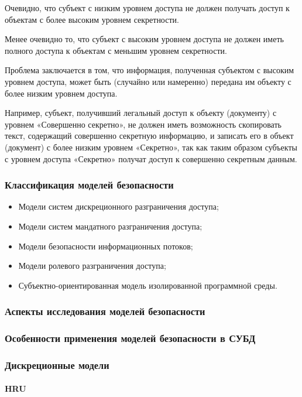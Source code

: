 Очевидно, что субъект с низким уровнем доступа не должен получать
доступ к объектам с более высоким уровнем секретности.

Менее очевидно то, что субъект с высоким уровнем доступа не должен иметь полного доступа к объектам с меньшим уровнем секретности.

Проблема заключается в том, что информация, полученная субъектом с высоким уровнем доступа, может быть (случайно или намеренно) передана им объекту с более низким уровнем доступа.

Например, субъект, получивший легальный доступ к объекту (документу) с уровнем «Совершенно секретно», не должен иметь возможность скопировать текст, содержащий совершенно секретную информацию, и записать его в объект (документ) с более низким уровнем «Секретно», так как таким образом субъекты с уровнем доступа «Секретно» получат доступ к совершенно секретным данным. 

\subsubsection{Классификация моделей безопасности}

\begin{itemize}
    \item Модели систем дискреционного разграничения доступа;
    \item Модели систем мандатного разграничения доступа;
    \item Модели безопасности информационных потоков;
    \item Модели ролевого разграничения доступа;
    \item Субъектно-ориентированная модель изолированной программной среды.
\end{itemize}

\subsubsection{Аспекты исследования моделей безопасности}
\subsubsection{Особенности применения моделей безопасности в СУБД}

\subsubsection{Дискреционные модели}
\paragraph{HRU}
